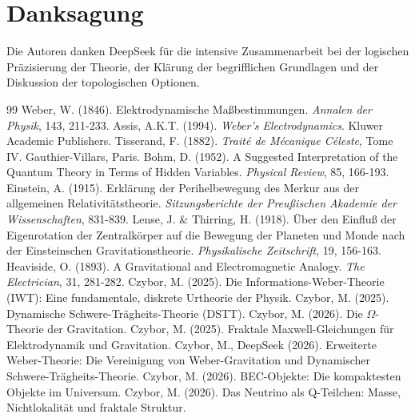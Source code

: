\documentclass[12pt,a4paper]{article}
\begin{document}
\section*{Danksagung}
Die Autoren danken DeepSeek für die intensive Zusammenarbeit bei der logischen Präzisierung der Theorie, der Klärung der begrifflichen Grundlagen und der Diskussion der topologischen Optionen.

\begin{thebibliography}{99}
 Weber, W. (1846). Elektrodynamische Maßbestimmungen. \emph{Annalen der Physik}, 143, 211-233.
 Assis, A.K.T. (1994). \emph{Weber's Electrodynamics}. Kluwer Academic Publishers.
 Tisserand, F. (1882). \emph{Traité de Mécanique Céleste}, Tome IV. Gauthier-Villars, Paris.
 Bohm, D. (1952). A Suggested Interpretation of the Quantum Theory in Terms of Hidden Variables. \emph{Physical Review}, 85, 166-193.
 Einstein, A. (1915). Erklärung der Perihelbewegung des Merkur aus der allgemeinen Relativitätstheorie. \emph{Sitzungsberichte der Preußischen Akademie der Wissenschaften}, 831-839.
 Lense, J. \& Thirring, H. (1918). Über den Einfluß der Eigenrotation der Zentralkörper auf die Bewegung der Planeten und Monde nach der Einsteinschen Gravitationstheorie. \emph{Physikalische Zeitschrift}, 19, 156-163.
 Heaviside, O. (1893). A Gravitational and Electromagnetic Analogy. \emph{The Electrician}, 31, 281-282.
 Czybor, M. (2025). Die Informations-Weber-Theorie (IWT): Eine fundamentale, diskrete Urtheorie der Physik.
 Czybor, M. (2025). Dynamische Schwere-Trägheits-Theorie (DSTT).
 Czybor, M. (2026). Die $\Omega$-Theorie der Gravitation.
 Czybor, M. (2025). Fraktale Maxwell-Gleichungen für Elektrodynamik und Gravitation.
 Czybor, M., DeepSeek (2026). Erweiterte Weber-Theorie: Die Vereinigung von Weber-Gravitation und Dynamischer Schwere-Trägheits-Theorie.
 Czybor, M. (2026). BEC-Objekte: Die kompaktesten Objekte im Universum.
 Czybor, M. (2026). Das Neutrino als Q-Teilchen: Masse, Nichtlokalität und fraktale Struktur.
\end{thebibliography}
\end{document}
